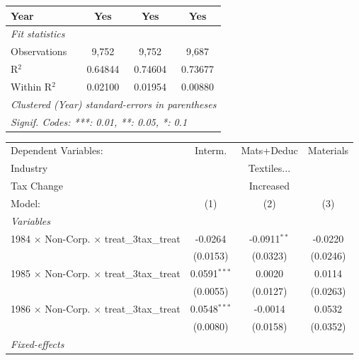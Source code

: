 \documentclass[
  12pt]{article}
\theoremstyle{definition}
\theoremstyle{remark}
\begin{document}
\begin{table}
\begin{minipage}{\linewidth}
\begin{tabular}{lccc}
   Year                                                    & Yes            & Yes            & Yes\\  
   \midrule
   \emph{Fit statistics}\\
   Observations                                            & 9,752          & 9,752          & 9,687\\  
   R$^2$                                                   & 0.64844        & 0.74604        & 0.73677\\  
   Within R$^2$                                            & 0.02100        & 0.01954        & 0.00880\\  
   \midrule \midrule
   \multicolumn{4}{l}{\emph{Clustered (Year) standard-errors in parentheses}}\\
   \multicolumn{4}{l}{\emph{Signif. Codes: ***: 0.01, **: 0.05, *: 0.1}}\\
\end{tabular}
\par\endgroup
\begingroup
\centering
\begin{tabular}{lccc}
   \tabularnewline \midrule \midrule
   Dependent Variables:                                    & Interm.        & Mats+Deduc     & Materials\\  
   Industry & \multicolumn{3}{c}{Textiles...} \\ 
   Tax Change & \multicolumn{3}{c}{Increased} \\ 
   Model:                                                  & (1)            & (2)            & (3)\\  
   \midrule
   \emph{Variables}\\
   1984 $\times$ Non-Corp. $\times$ treat\_3tax\_treat     & -0.0264        & -0.0911$^{**}$ & -0.0220\\   
                                                           & (0.0153)       & (0.0323)       & (0.0246)\\   
   1985 $\times$ Non-Corp. $\times$ treat\_3tax\_treat     & 0.0591$^{***}$ & 0.0020         & 0.0114\\   
                                                           & (0.0055)       & (0.0127)       & (0.0263)\\   
   1986 $\times$ Non-Corp. $\times$ treat\_3tax\_treat     & 0.0548$^{***}$ & -0.0014        & 0.0532\\   
                                                           & (0.0080)       & (0.0158)       & (0.0352)\\   
   \midrule
   \emph{Fixed-effects}\\

\end{tabular}
\end{minipage}
\end{table}
\end{document}
